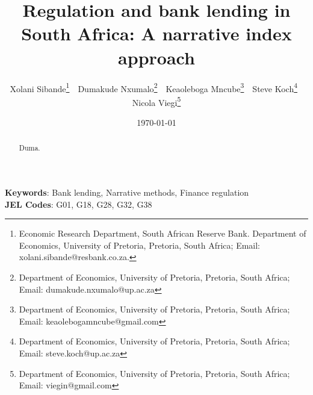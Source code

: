\title{Regulation and bank lending in South Africa: A narrative index approach}


\author {Xolani Sibande\footnote{Economic Research Department, South African Reserve Bank. Department of Economics, University of Pretoria, Pretoria, South Africa; Email: xolani.sibande@resbank.co.za.} \,\,
Dumakude Nxumalo\footnote{Department of Economics, University of Pretoria, Pretoria, South Africa; Email: dumakude.nxumalo@up.ac.za} \,\, 
Keaoleboga Mncube\footnote{Department of Economics, University of Pretoria, Pretoria, South Africa; Email: keaolebogamncube@gmail.com} \,\, 
Steve Koch\footnote{Department of Economics, University of Pretoria, Pretoria, South Africa; Email: steve.koch@up.ac.za} \,\, 
Nicola Viegi\footnote{Department of Economics, University of Pretoria, Pretoria, South Africa; Email: viegin@gmail.com}}


\date{\today}
\maketitle

\begin{abstract}
Duma.

\end{abstract}

\noindent\textbf{Keywords}: Bank lending, Narrative methods, Finance regulation\\
\textbf{JEL Codes}: G01, G18, G28, G32, G38
\newpage